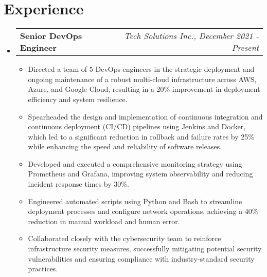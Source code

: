 \documentclass[a4paper,10pt]{article}
\begin{document}
\section*{Experience}
\begin{itemize}[left=0pt]
    \item 
    \begin{tabular}{p{} r}
        \textbf{Senior DevOps Engineer} & \textit{Tech Solutions Inc., December 2021 - Present} \\
    \end{tabular}
    \begin{itemize}[left=0pt]
        \item Directed a team of 5 DevOps engineers in the strategic deployment and ongoing maintenance of a robust multi-cloud infrastructure across AWS, Azure, and Google Cloud, resulting in a 20\% improvement in deployment efficiency and system resilience.
        \item Spearheaded the design and implementation of continuous integration and continuous deployment (CI/CD) pipelines using Jenkins and Docker, which led to a significant reduction in rollback and failure rates by 25\% while enhancing the speed and reliability of software releases.
        \item Developed and executed a comprehensive monitoring strategy using Prometheus and Grafana, improving system observability and reducing incident response times by 30\%.
        \item Engineered automated scripts using Python and Bash to streamline deployment processes and configure network operations, achieving a 40\% reduction in manual workload and human error.
        \item Collaborated closely with the cybersecurity team to reinforce infrastructure security measures, successfully mitigating potential security vulnerabilities and ensuring compliance with industry-standard security practices.
    \end{itemize}

\hfill


\end{itemize}
\end{document}
